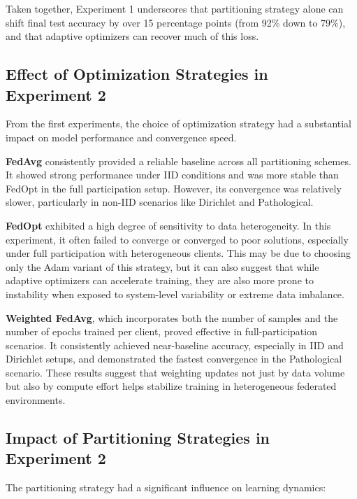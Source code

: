 \documentclass[11pt]{article}
\begin{document}
    Taken together, Experiment 1 underscores that partitioning strategy alone can shift final test accuracy by over 15 percentage points (from 92\% down to 79\%), and that adaptive optimizers can recover much of this loss.

    \subsection{Effect of Optimization Strategies in Experiment 2}

    From the first experiments, the choice of optimization strategy had a substantial impact on model performance and convergence speed.

    \textbf{FedAvg} consistently provided a reliable baseline across all partitioning schemes. It showed strong performance under IID conditions and was more stable than FedOpt in the full participation setup. However, its convergence was relatively slower, particularly in non-IID scenarios like Dirichlet and Pathological.

    \textbf{FedOpt} exhibited a high degree of sensitivity to data heterogeneity. In this experiment, it often failed to converge or converged to poor solutions, especially under full participation with heterogeneous clients. This may be due to choosing only the Adam variant of this strategy, but it can also suggest that while adaptive optimizers can accelerate training, they are also more prone to instability when exposed to system-level variability or extreme data imbalance.

    \textbf{Weighted FedAvg}, which incorporates both the number of samples and the number of epochs trained per client, proved effective in full-participation scenarios. It consistently achieved near-baseline accuracy, especially in IID and Dirichlet setups, and demonstrated the fastest convergence in the Pathological scenario. These results suggest that weighting updates not just by data volume but also by compute effort helps stabilize training in heterogeneous federated environments.

    \subsection{Impact of Partitioning Strategies in Experiment 2}

    The partitioning strategy had a significant influence on learning dynamics:
\end{document}
